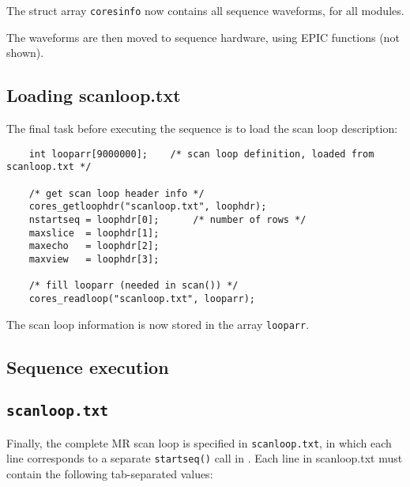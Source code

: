 The struct array {\tt coresinfo} now contains all sequence waveforms, for all modules.

The waveforms are then moved to sequence hardware, using EPIC functions (not shown).


\subsection{Loading scanloop.txt}

The final task before executing the sequence is to load the scan loop description:

\begin{lstlisting}
	int looparr[9000000];    /* scan loop definition, loaded from scanloop.txt */

	/* get scan loop header info */
	cores_getloophdr("scanloop.txt", loophdr);
	nstartseq = loophdr[0];      /* number of rows */
	maxslice  = loophdr[1];
	maxecho   = loophdr[2];
	maxview   = loophdr[3];

	/* fill looparr (needed in scan()) */
	cores_readloop("scanloop.txt", looparr);
\end{lstlisting}

The scan loop information is now stored in the array {\tt looparr}.


\subsection{Sequence execution}



\subsection{\tt scanloop.txt}
Finally, the complete MR scan loop is specified in {\tt scanloop.txt}, in which each line corresponds to a separate {\tt startseq()} call in \toppe.
Each line in scanloop.txt must contain the following tab-separated values:

